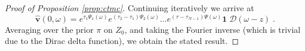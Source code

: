 \documentclass[onefignum,onetabnum]{siamonline190516}
\begin{document}
\begin{proof}[{Proof of Proposition \ref{prop:ctmc}}]
Continuing iteratively we arrive at
\begin{equation}
    \boldsymbol{\hat{v}}(0, \omega) =  e^{\tau_1 \Psi_{1}(\omega)} e^{(\tau_{2} - \tau_{1}) \Psi_{2}(\omega)} \dots e^{(\tau - \tau_{N-1}) \Psi(\omega)} \boldsymbol{1}\;\mathcal{D}(\omega-z)\;.
\end{equation}
Averaging over the prior $\pi$ on $Z_0$, and taking the Fourier inverse (which is trivial due to the Dirac delta function), we obtain the stated result.
\end{proof}



\end{document}
